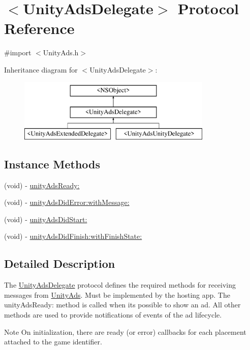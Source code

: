 \hypertarget{protocol_unity_ads_delegate-p}{}\section{$<$Unity\+Ads\+Delegate$>$ Protocol Reference}
\label{protocol_unity_ads_delegate-p}


{\ttfamily \#import $<$Unity\+Ads.\+h$>$}

Inheritance diagram for $<$Unity\+Ads\+Delegate$>$\+:\begin{figure}[H]
\begin{center}
\leavevmode
\includegraphics[height=3.000000cm]{protocol_unity_ads_delegate-p}
\end{center}
\end{figure}
\subsection*{Instance Methods}
\begin{DoxyCompactItemize}
\item 
(void) -\/ \mbox{\hyperlink{protocol_unity_ads_delegate-p_a8fc6e8a10ffb53dbc8f4c84312e4d544}{unity\+Ads\+Ready\+:}}
\item 
(void) -\/ \mbox{\hyperlink{protocol_unity_ads_delegate-p_a2272989530c7cd577277d7f17bde3215}{unity\+Ads\+Did\+Error\+:with\+Message\+:}}
\item 
(void) -\/ \mbox{\hyperlink{protocol_unity_ads_delegate-p_a04f51d2948959482a526886a72a6769b}{unity\+Ads\+Did\+Start\+:}}
\item 
(void) -\/ \mbox{\hyperlink{protocol_unity_ads_delegate-p_a4b243b4d6d509ce4982bf8416f29dc42}{unity\+Ads\+Did\+Finish\+:with\+Finish\+State\+:}}
\end{DoxyCompactItemize}


\subsection{Detailed Description}
The {\ttfamily \mbox{\hyperlink{protocol_unity_ads_delegate-p}{Unity\+Ads\+Delegate}}} protocol defines the required methods for receiving messages from \mbox{\hyperlink{interface_unity_ads}{Unity\+Ads}}. Must be implemented by the hosting app. The unity\+Ads\+Ready\+: method is called when it\textquotesingle{}s possible to show an ad. All other methods are used to provide notifications of events of the ad lifecycle. \begin{DoxyNote}{Note}
On initialization, there are ready (or error) callbacks for each placement attached to the game identifier. 
\end{DoxyNote}


